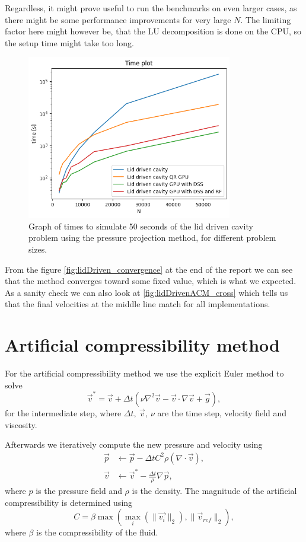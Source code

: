 \documentclass{article}
\begin{document}
Regardless, it might prove useful to run the benchmarks on even larger cases, as there might be some 
performance improvements for very large \(N\). The limiting factor here might however be, that 
the LU decomposition is done on the CPU, so the setup time might take too long.
\begin{figure}[h!] 
    \centering 
    \includegraphics[width=0.8\textwidth]{plots/lidDriven_time.png} 
    \caption{Graph of times to simulate 50 seconds of the lid driven cavity problem using
    the pressure projection method, for different problem sizes.} 
    \label{fig:lidDriven_time} 
\end{figure}

From the figure \ref{fig:lidDriven_convergence} at the end of the report we can see that the 
method converges toward some fixed value, which is what we expected. As a sanity check we can 
also look at \ref{fig:lidDrivenACM_cross} which tells us that the final velocities at the 
middle line match for all implementations.

\section{Artificial compressibility method}
For the artificial compressibility method we use the explicit Euler method to solve 
\begin{equation}
    \vec{v}^* = \vec{v} + \Delta t \left( \nu \nabla^2 \vec{v} - \vec{v}
    \cdot \nabla\vec{v} + \vec{g} \right), 
\end{equation}
for the intermediate step, where \(\Delta t,~\vec{v},~\nu\) are the time step, velocity field 
and viscosity.

Afterwards we iteratively compute the new pressure and velocity using 
\begin{align}
    \vec{p} & \leftarrow \vec{p} - \Delta t C^2  \rho  (\nabla \cdot \vec{v}), \\
    \vec{v} &\leftarrow \vec{v}^* - \frac{\Delta t}{\rho} \nabla \vec{p},
\end{align}
where \(p\) is the pressure field and \(\rho\) is the density. The magnitude of the 
artificial compressibility is determined using 
\begin{equation}
    C = \beta \max(\max_i(\lVert\vec{v_i}\rVert_2),\lVert\vec{v}_{ref}\rVert_2), 
\end{equation}
where \(\beta\) is the compressibility of the fluid.
\end{document}
